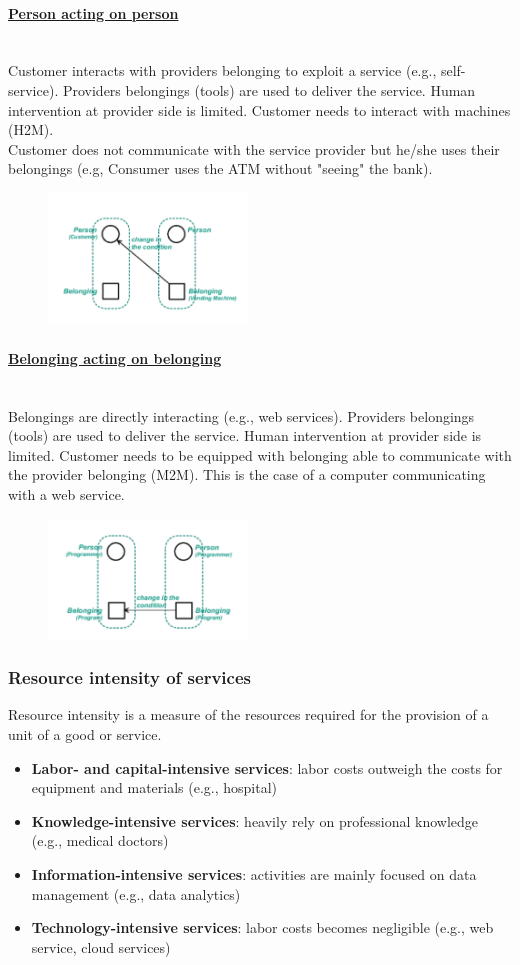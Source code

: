 \documentclass[10pt,a4paper]{article}
\newcommand{\myparagraph}[1]{\paragraph{\uline{#1}}\mbox{}\\[0.05in]}
\begin{document}
\myparagraph{Person acting on person}
Customer interacts with providers belonging to exploit a service (e.g., self-service). Providers belongings (tools) are used to deliver the service. Human intervention at provider side is limited. Customer needs to interact with machines (H2M). \\ 
Customer does not communicate with the service provider but he/she uses their belongings (e.g, Consumer uses the ATM without "seeing" the bank). 
\begin{figure}[h!]
 \hfill \includegraphics[width=150pt]{images/belonging-person}\hspace*{\fill}
  \label{fig:belonging-person}
\end{figure}
\myparagraph{Belonging acting on belonging}
Belongings are directly interacting (e.g., web services). Providers belongings (tools) are used to deliver the service. Human intervention at provider side is limited. Customer needs to be equipped with belonging able to communicate with the provider belonging (M2M). This is the case of a computer communicating with a web service.
\begin{figure}[h!]
 \hfill \includegraphics[width=150pt]{images/belonging-belonging}\hspace*{\fill}
  \label{fig:belonging-belonging}
\end{figure}
\subsubsection{Resource intensity of services}
Resource intensity is a measure of the resources required for the provision of a unit of a good or service.
\begin{itemize}
	\item \textbf{Labor- and capital-intensive services}: labor costs outweigh the costs for equipment and materials (e.g., hospital)
	\item \textbf{Knowledge-intensive services}: heavily rely on professional knowledge (e.g., medical doctors)
	\item \textbf{Information-intensive services}: activities are mainly focused on data management (e.g., data analytics)
	\item \textbf{Technology-intensive services}: labor costs becomes negligible (e.g., web service, cloud services)
\end{itemize}
\end{document}
